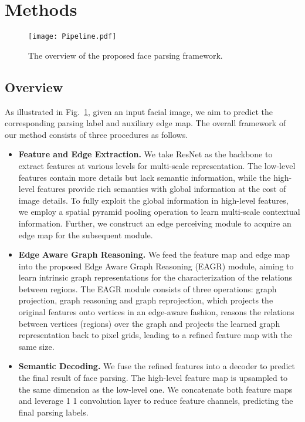 \documentclass[runningheads]{llncs}
\begin{document}
\section{Methods}


\begin{figure}[t]
    \centering
    \texttt{[image: Pipeline.pdf]}
    \caption{The overview of the proposed face parsing framework.}
    \label{fig:framework}
\end{figure}

\subsection{Overview}\label{sec3.1}

As illustrated in Fig.~\ref{fig:framework}, given an input facial image, we aim to predict the corresponding parsing label and auxiliary edge map. The overall framework of our method consists of three procedures as follows. 

\begin{itemize}
    \item \textbf{Feature and Edge Extraction.} We take ResNet as the backbone to extract features at various levels for multi-scale representation.  
    The low-level features contain more details but lack semantic information, while the high-level features provide rich semantics with global information at the cost of image details. To fully exploit the global information in high-level features, we employ a spatial pyramid pooling operation to learn multi-scale contextual information.
    Further, we construct an edge perceiving module to acquire an edge map for the subsequent module. 
    
    \item \textbf{Edge Aware Graph Reasoning.} We feed the feature map and edge map into the proposed Edge Aware Graph Reasoning (EAGR) module, aiming to learn intrinsic graph representations for the characterization of the relations between regions. 
    The EAGR module consists of three operations: graph projection, graph reasoning and graph reprojection, which projects the original features onto vertices in an edge-aware fashion, reasons the relations between vertices (regions) over the graph and projects the learned graph representation back to pixel grids, leading to a refined feature map with the same size.
    
    \item \textbf{Semantic Decoding.} We fuse the refined features into a decoder to predict the final result of face parsing. The high-level feature map is upsampled to the same dimension as the low-level one. 
    We concatenate both feature maps and leverage 1  1 convolution layer to reduce feature channels, predicting the final parsing labels.
\end{itemize}
\end{document}
